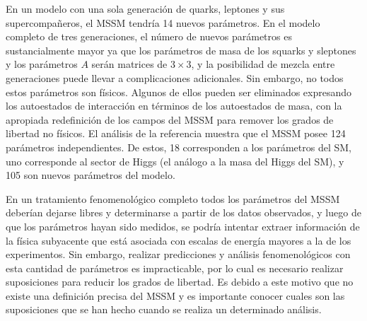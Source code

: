 
En un modelo con una sola generación de quarks, leptones y sus
supercompa\~neros, el MSSM tendría 14 nuevos parámetros. En el modelo
completo de tres generaciones, el número de nuevos parámetros es sustancialmente
mayor ya que los parámetros de masa de los squarks y sleptones y los parámetros
$A$ serán matrices de $3 \times 3$, y la posibilidad de mezcla entre
generaciones puede llevar a complicaciones adicionales. Sin embargo, no todos
estos parámetros son físicos. Algunos de ellos pueden ser eliminados
expresando los autoestados de interacción en términos de los autoestados de
masa, con la apropiada redefinición de los campos del MSSM para remover los
grados de libertad no físicos. El análisis de la referencia
\cite{Dimopoulos:1995ju} muestra que el MSSM posee 124 parámetros
independientes. De estos, 18 corresponden a los parámetros del SM, uno
corresponde al sector de Higgs (el análogo a la masa del Higgs del SM), y 105
son nuevos parámetros del modelo.

En un tratamiento fenomenológico completo todos los parámetros del MSSM deberían
dejarse libres y determinarse a partir de los datos observados, y luego de que
los parámetros hayan sido medidos, se podría intentar extraer información de la
física subyacente que está asociada con escalas de energía mayores a la de los
experimentos. Sin embargo, realizar predicciones y análisis fenomenológicos con esta
cantidad de parámetros es impracticable, por lo cual es necesario realizar
suposiciones para reducir los grados de libertad. Es debido a este motivo que no
existe una definición precisa del MSSM y es importante conocer cuales son las
suposiciones que se han hecho cuando se realiza un determinado análisis.


